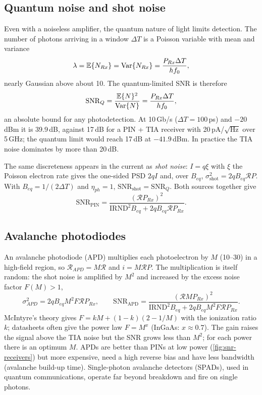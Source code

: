 \subsection{Quantum noise and shot noise}
Even with a noiseless amplifier, the quantum nature of light limits detection. The number of
photons arriving in a window $\Delta T$ is a Poisson variable with mean and variance
\begin{equation}
  \lambda=\mathbb{E}\{N_{Rx}\}=\operatorname{Var}\{N_{Rx}\}=\frac{P_{Rx}\Delta T}{hf_0},
\end{equation}
nearly Gaussian above about 10. The quantum-limited SNR is therefore
\begin{equation}
  \mathrm{SNR}_Q=\frac{\mathbb{E}\{N\}^2}{\operatorname{Var}\{N\}}=\frac{P_{Rx}\Delta T}{hf_0},
\end{equation}
an absolute bound for any photodetection. At 10\,Gb/s ($\Delta T=100$\,ps) and $-20$\,dBm it is 39.9\,dB,
against 17\,dB for a PIN + TIA receiver with 20\,pA/$\sqrt{\mathrm{Hz}}$ over 5\,GHz; the quantum limit would
reach 17\,dB at $-41.9$\,dBm. In practice the TIA noise dominates by more than 20\,dB.

The same discreteness appears in the current as \emph{shot noise}: $I=q\xi$ with $\xi$ the Poisson
electron rate gives the one-sided PSD $2qI$ and, over $B_{eq}$, $\sigma_{\mathrm{shot}}^2=2qB_{eq}\mathcal RP$. With
$B_{eq}=1/(2\Delta T)$ and $\eta_{ph}=1$, $\mathrm{SNR}_{\mathrm{shot}}=\mathrm{SNR}_Q$. Both sources together give
\begin{equation}
  \mathrm{SNR}_{\mathrm{PIN}}=\frac{(\mathcal RP_{Rx})^2}{\mathrm{IRND}^2B_{eq}+2qB_{eq}\mathcal RP_{Rx}} .
\end{equation}

\subsection{Avalanche photodiodes}
An avalanche photodiode (APD) multiplies each photoelectron by $M$ (10--30) in a high-field
region, so $\mathcal R_{APD}=M\mathcal R$ and $i=M\mathcal RP$. The multiplication is itself random: the shot noise is
amplified by $M^2$ and increased by the excess noise factor $F(M)>1$,
\begin{equation}
  \sigma_{APD}^2=2qB_{eq}M^2F\mathcal RP_{Rx},\qquad
  \mathrm{SNR}_{\mathrm{APD}}=\frac{(\mathcal RMP_{Rx})^2}{\mathrm{IRND}^2B_{eq}+2qB_{eq}M^2F\mathcal RP_{Rx}} .
\end{equation}
McIntyre's theory gives $F=kM+(1-k)(2-1/M)$ with the ionization ratio $k$; datasheets often give the
power law $F=M^x$ (InGaAs: $x\approx0.7$). The gain raises the signal above the TIA noise but the SNR
grows less than $M^2$; for each power there is an optimum $M$. APDs are better than PINs at low
power (\cref{fig:snr-receivers}) but more expensive, need a high reverse bias and have less
bandwidth (avalanche build-up time). Single-photon avalanche detectors (SPADs), used in quantum
communications, operate far beyond breakdown and fire on single photons.

